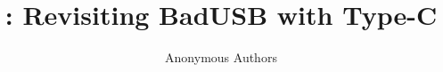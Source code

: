 \documentclass[conference]{IEEEtran}
\begin{document}
\title{\tool: Revisiting BadUSB with Type-C}

\author{Anonymous Authors}

\maketitle
\thispagestyle{plain}
\pagestyle{plain}
\end{document}
